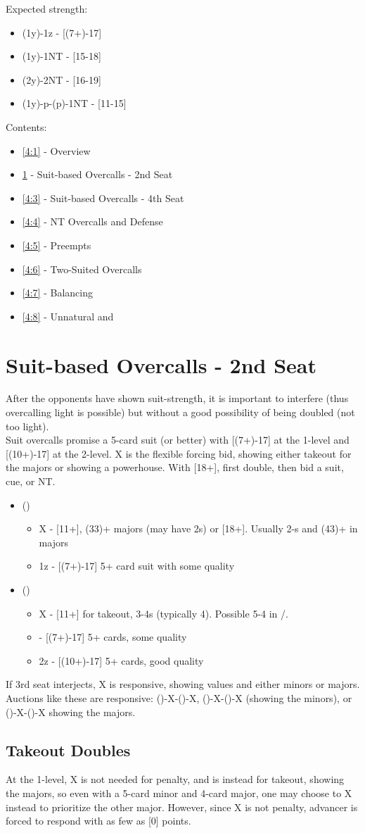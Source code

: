 \documentclass[12pt]{report}
\newcommand{\n}{\\}
\newcommand{\ul}[1]{\begin{itemize}#1\end{itemize}}
\newcommand{\li}{\item[~]}
\begin{document}
    Expected strength:
    \begin{itemize} \itemsep0em
        \li (1y)-1z - [(7+)-17]
        \li (1y)-1NT - [15-18]
        \li (2y)-2NT - [16-19]
        \li (1y)-p-(p)-1NT - [11-15] \n
    \end{itemize}

    Contents:
    \ul {
        \li \ref{4:1} - Overview
        \li \ref{4:2} - Suit-based Overcalls - 2nd Seat
        \li \ref{4:3} - Suit-based Overcalls - 4th Seat
        \li \ref{4:4} - NT Overcalls and Defense
        \li \ref{4:5} - Preempts
        \li \ref{4:6} - Two-Suited Overcalls
        \li \ref{4:7} - Balancing
        \li \ref{4:8} - Unnatural \cl1 and \di1
    }

\section{Suit-based Overcalls - 2nd Seat} \label{4:2}

    After the opponents have shown suit-strength, it is important to interfere (thus overcalling light is possible) but without a good possibility of being doubled (not too light). \n

    Suit overcalls promise a 5-card suit (or better) with [(7+)-17] at the 1-level and [(10+)-17] at the 2-level.  X is the flexible forcing bid, showing either takeout for the majors or showing a powerhouse.  With [18+], first double, then bid a suit, cue, or NT.

    \ul {
        \li ()
        \ul {
            \li X - [11+], (33)+ majors (may have 2\di{}s) or [18+].  Usually 2-\cl{}s and (43)+ in majors
            \li 1z - [(7+)-17] 5+ card suit with some quality
        }
        \li (\he1)
        \ul {
            \li X - [11+] for takeout, 3-4\sp{}s (typically 4).  Possible 5-4 in \di{}/\sp{}.
            \li \sp1 - [(7+)-17] 5+ cards, some quality
            \li 2z - [(10+)-17] 5+ cards, good quality
        }
    }

    If 3rd seat interjects, X is responsive, showing values and either minors or majors.  Auctions like these are responsive: ()-X-()-X, ()-X-()-X (showing the minors), or ()-X-()-X showing the majors.

\subsection{Takeout Doubles}

    At the 1-level, X is not needed for penalty, and is instead for takeout, showing the majors, so even with a 5-card minor and 4-card major, one may choose to X instead to prioritize the other major. However, since X is not penalty, advancer is forced to respond with as few as [0] points.\n
\end{document}
